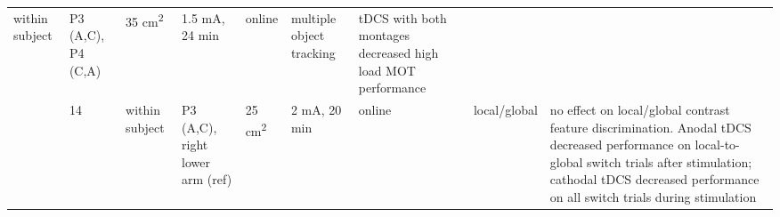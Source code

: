\documentclass[11pt,english,]{memoir}
\begin{document}
\begin{longtable}[]{@{}lllllllll@{}}
\begin{minipage}[t]{0.05\columnwidth}
within
subject\strut
\end{minipage} & \begin{minipage}[t]{0.12\columnwidth}\raggedright
P3 (A,C), P4 (C,A)\strut
\end{minipage} & \begin{minipage}[t]{0.04\columnwidth}\raggedright
35
cm\textsuperscript{2}\strut
\end{minipage} & \begin{minipage}[t]{0.05\columnwidth}\raggedright
1.5
mA, 24
min\strut
\end{minipage} & \begin{minipage}[t]{0.05\columnwidth}\raggedright
online\strut
\end{minipage} & \begin{minipage}[t]{0.08\columnwidth}\raggedright
multiple
object
tracking\strut
\end{minipage} & \begin{minipage}[t]{0.27\columnwidth}\raggedright
tDCS with both montages decreased high load MOT
performance\strut
\end{minipage}\tabularnewline
\begin{minipage}[t]{0.08\columnwidth}\raggedright
\textcite{Stone2009}\strut
\end{minipage} & \begin{minipage}[t]{0.03\columnwidth}\raggedright
14\strut
\end{minipage} & \begin{minipage}[t]{0.05\columnwidth}\raggedright
within
subject\strut
\end{minipage} & \begin{minipage}[t]{0.12\columnwidth}\raggedright
P3 (A,C), right
lower arm (ref)\strut
\end{minipage} & \begin{minipage}[t]{0.04\columnwidth}\raggedright
25
cm\textsuperscript{2}\strut
\end{minipage} & \begin{minipage}[t]{0.05\columnwidth}\raggedright
2 mA,
20 min\strut
\end{minipage} & \begin{minipage}[t]{0.05\columnwidth}\raggedright
online\strut
\end{minipage} & \begin{minipage}[t]{0.08\columnwidth}\raggedright
local/global\strut
\end{minipage} & \begin{minipage}[t]{0.27\columnwidth}\raggedright
no effect on local/global contrast feature
discrimination. Anodal tDCS decreased performance
on local-to-global switch trials after
stimulation; cathodal tDCS decreased performance
on all switch trials during stimulation\strut
\end{minipage}\tabularnewline
\bottomrule
\end{longtable}
\end{document}

